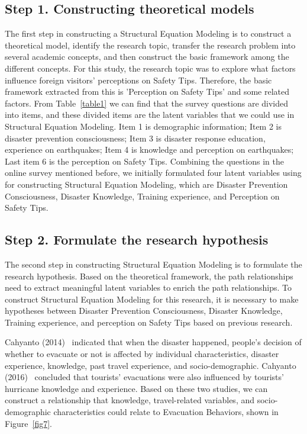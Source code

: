 \subsection{Step 1. Constructing theoretical models}
The first step in constructing a Structural Equation Modeling is to construct a theoretical model, identify the research topic, transfer the research problem into several academic concepts, and then construct the basic framework among the different concepts. For this study, the research topic was to explore what factors influence foreign visitors' perceptions on Safety Tips. Therefore, the basic framework extracted from this is 'Perception on Safety Tips' and some related factors. From Table~\ref{table1} we can find that the survey questions are divided into items, and these divided items are the latent variables that we could use in Structural Equation Modeling. Item 1 is demographic information; Item 2 is disaster prevention consciousness; Item 3 is disaster response education, experience on earthquakes; Item 4 is knowledge and perception on earthquakes; Last item 6 is the perception on Safety Tips. Combining the questions in the online survey mentioned before, we initially formulated four latent variables using for constructing Structural Equation Modeling, which are Disaster Prevention Consciousness, Disaster Knowledge, Training experience, and Perception on Safety Tips.

\subsection{Step 2. Formulate the research hypothesis}
The second step in constructing Structural Equation Modeling is to formulate the research hypothesis. Based on the theoretical framework, the path relationships need to extract meaningful latent variables to enrich the path relationships. To construct Structural Equation Modeling for this research, it is necessary to make hypotheses between Disaster Prevention Consciousness, Disaster Knowledge, Training experience, and perception on Safety Tips based on previous research. 


Cahyanto (2014)~\cite{ref19} indicated that when the disaster happened, people's decision of whether to evacuate or not is affected by individual characteristics, disaster experience, knowledge, past travel experience, and socio-demographic. Cahyanto (2016)~\cite{Cahyanto2016StatedPO} concluded that tourists' evacuations were also influenced by tourists' hurricane knowledge and experience. Based on these two studies, we can construct a relationship that knowledge, travel-related variables, and socio-demographic characteristics could relate to Evacuation Behaviors, shown in Figure~\ref{fig7}. 


